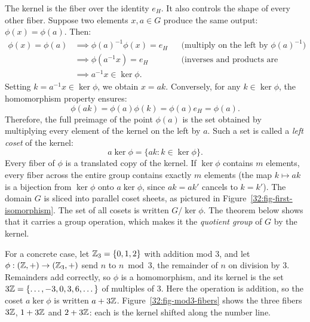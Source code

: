 The kernel is the fiber over the identity $e_H$. It also controls the shape of every other fiber. Suppose two elements $x, a \in G$ produce the same output: $\phi(x) = \phi(a)$. Then:
\begin{align*}
\phi(x) = \phi(a) &\implies \phi(a)^{-1}\phi(x) = e_H && \text{(multiply on the left by $\phi(a)^{-1}$)} \\
&\implies \phi(a^{-1}x) = e_H && \text{(inverses and products are preserved)} \\
&\implies a^{-1}x \in \ker\phi.
\end{align*}
Setting $k = a^{-1}x \in \ker\phi$, we obtain $x = ak$. Conversely, for any $k \in \ker\phi$, the homomorphism property ensures:
\[
\phi(ak) = \phi(a)\phi(k) = \phi(a)e_H = \phi(a).
\]
Therefore, the full preimage of the point $\phi(a)$ is the set obtained by multiplying every element of the kernel on the left by $a$. Such a set is called a \emph{left coset} of the kernel:
\[
a\ker\phi = \{ak : k \in \ker\phi\}.
\]
Every fiber of $\phi$ is a translated copy of the kernel. If $\ker\phi$ contains $m$ elements, every fiber across the entire group contains exactly $m$ elements (the map $k \mapsto ak$ is a bijection from $\ker\phi$ onto $a\ker\phi$, since $ak = ak'$ cancels to $k = k'$). The domain $G$ is sliced into parallel coset sheets, as pictured in Figure~\ref{32:fig-first-isomorphism}. The set of all cosets is written $G/\ker\phi$. The theorem below shows that it carries a group operation, which makes it the \emph{quotient group} of $G$ by the kernel.

For a concrete case, let $\mathbb{Z}_3 = \{0, 1, 2\}$ with addition mod $3$, and let $\phi: (\mathbb{Z}, +) \to (\mathbb{Z}_3, +)$ send $n$ to $n \bmod 3$, the remainder of $n$ on division by $3$. Remainders add correctly, so $\phi$ is a homomorphism, and its kernel is the set $3\mathbb{Z} = \{\dots, -3, 0, 3, 6, \dots\}$ of multiples of $3$. Here the operation is addition, so the coset $a\ker\phi$ is written $a + 3\mathbb{Z}$. Figure~\ref{32:fig-mod3-fibers} shows the three fibers $3\mathbb{Z}$, $1 + 3\mathbb{Z}$ and $2 + 3\mathbb{Z}$: each is the kernel shifted along the number line.

